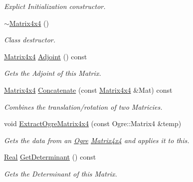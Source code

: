 \begin{DoxyCompactItemize}
\begin{DoxyCompactList}\small\item\em Explict Initialization constructor. \item\end{DoxyCompactList}\item 
\hypertarget{classMezzanine_1_1Matrix4x4_a3273ea5ae21403d1067a924bcbbf646a}{
\hyperlink{classMezzanine_1_1Matrix4x4_a3273ea5ae21403d1067a924bcbbf646a}{$\sim$Matrix4x4} ()}
\label{classMezzanine_1_1Matrix4x4_a3273ea5ae21403d1067a924bcbbf646a}

\begin{DoxyCompactList}\small\item\em Class destructor. \item\end{DoxyCompactList}\item 
\hyperlink{classMezzanine_1_1Matrix4x4}{Matrix4x4} \hyperlink{classMezzanine_1_1Matrix4x4_ab7a2042ea144a0ed3ea8b6c5a1062956}{Adjoint} () const 
\begin{DoxyCompactList}\small\item\em Gets the Adjoint of this Matrix. \item\end{DoxyCompactList}\item 
\hyperlink{classMezzanine_1_1Matrix4x4}{Matrix4x4} \hyperlink{classMezzanine_1_1Matrix4x4_abe22ec7824d294d68ac6182ea1fed5c9}{Concatenate} (const \hyperlink{classMezzanine_1_1Matrix4x4}{Matrix4x4} \&Mat) const 
\begin{DoxyCompactList}\small\item\em Combines the translation/rotation of two Matricies. \item\end{DoxyCompactList}\item 
void \hyperlink{classMezzanine_1_1Matrix4x4_a7e4c5a55410bf4d75d1ba0a960b07461}{ExtractOgreMatrix4x4} (const Ogre::Matrix4 \&temp)
\begin{DoxyCompactList}\small\item\em Gets the data from an \hyperlink{namespaceOgre}{Ogre} \hyperlink{classMezzanine_1_1Matrix4x4}{Matrix4x4} and applies it to this. \item\end{DoxyCompactList}\item 
\hyperlink{namespaceMezzanine_a726731b1a7df72bf3583e4a97282c6f6}{Real} \hyperlink{classMezzanine_1_1Matrix4x4_acbe25840db867b09851027688fbca25d}{GetDeterminant} () const 
\begin{DoxyCompactList}\small\item\em Gets the Determinant of this Matrix. \item\end{DoxyCompactList}\item 

\end{DoxyCompactItemize}
